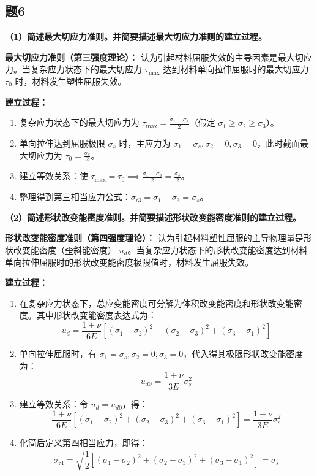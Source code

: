\documentclass[UTF8,fontset=windows]{ctexart}
\begin{document}
\subsection*{题6}
\textbf{（1）简述最大切应力准则。并简要描述最大切应力准则的建立过程。}

\textbf{最大切应力准则（第三强度理论）：}
认为引起材料屈服失效的主导因素是最大切应力。当复杂应力状态下的最大切应力 $\tau_{\text{max}}$ 达到材料单向拉伸屈服时的最大切应力 $\tau_0$ 时，材料发生塑性屈服失效。

\textbf{建立过程：}
\begin{enumerate}
    \item 复杂应力状态下的最大切应力为 $\tau_{\text{max}} = \frac{\sigma_1 - \sigma_3}{2}$（假定 $\sigma_1 \ge \sigma_2 \ge \sigma_3$）。
    \item 单向拉伸达到屈服极限 $\sigma_s$ 时，主应力为 $\sigma_1 = \sigma_s, \sigma_2 = 0, \sigma_3 = 0$，此时截面最大切应力为 $\tau_0 = \frac{\sigma_s}{2}$。
    \item 建立等效关系：使 $\tau_{\text{max}} = \tau_0 \implies \frac{\sigma_1 - \sigma_3}{2} = \frac{\sigma_s}{2}$。
    \item 整理得到第三相当应力公式：$\sigma_{\text{r3}} = \sigma_1 - \sigma_3 = \sigma_s$。
\end{enumerate}

\textbf{（2）简述形状改变能密度准则。并简要描述形状改变能密度准则的建立过程。}

\textbf{形状改变能密度准则（第四强度理论）：}
认为引起材料塑性屈服的主导物理量是形状改变能密度（歪斜能密度） $u_d$。当复杂应力状态下的形状改变能密度达到材料单向拉伸屈服时的形状改变能密度极限值时，材料发生屈服失效。

\textbf{建立过程：}
\begin{enumerate}
    \item 在复杂应力状态下，总应变能密度可分解为体积改变能密度和形状改变能密度。其中形状改变能密度表达式为：
          \[
              u_d = \frac{1+\nu}{6E} \left[ (\sigma_1 - \sigma_2)^2 + (\sigma_2 - \sigma_3)^2 + (\sigma_3 - \sigma_1)^2 \right]
          \]
    \item 单向拉伸屈服时，有 $\sigma_1 = \sigma_s, \sigma_2 = 0, \sigma_3 = 0$，代入得其极限形状改变能密度为：
          \[
              u_{d0} = \frac{1+\nu}{3E} \sigma_s^2
          \]
    \item 建立等效关系：令 $u_d = u_{d0}$，得：
          \[
              \frac{1+\nu}{6E} \left[ (\sigma_1 - \sigma_2)^2 + (\sigma_2 - \sigma_3)^2 + (\sigma_3 - \sigma_1)^2 \right] = \frac{1+\nu}{3E} \sigma_s^2
          \]
    \item 化简后定义第四相当应力，即得：
          \[
              \sigma_{\text{r4}} = \sqrt{\frac{1}{2} \left[ (\sigma_1 - \sigma_2)^2 + (\sigma_2 - \sigma_3)^2 + (\sigma_3 - \sigma_1)^2 \right]} = \sigma_s
          \]
\end{enumerate}
\end{document}
